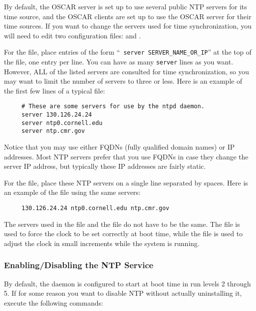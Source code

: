 By default, the OSCAR server is set up to use several public NTP
servers for its time source, and the OSCAR clients are set up to use
the OSCAR server for their time sources.  If you want to change the
servers used for time synchronization, you will need to edit two
configuration files:  and
.

For the  file, place entries of the form ``{\tt
  server SERVER\_NAME\_OR\_IP}'' at the top of the file, one entry per
line.  You can have as many {\tt server} lines as you want.  However,
ALL of the listed servers are consulted for time synchronization, so
you may want to limit the number of servers to three or less.  Here is
an example of the first few lines of a typical 
file:

\begin{verbatim}
     # These are some servers for use by the ntpd daemon.
     server 130.126.24.24
     server ntp0.cornell.edu
     server ntp.cmr.gov
\end{verbatim}

Notice that you may use either FQDNs (fully qualified domain names) or
IP addresses.  Most NTP servers prefer that you use FQDNs in case they
change the server IP address, but typically these IP addresses are
fairly static.

For the  file, place these NTP servers on
a single line separated by spaces.  Here is an example of the
 file using the same servers:

\begin{verbatim}
     130.126.24.24 ntp0.cornell.edu ntp.cmr.gov
\end{verbatim}

The servers used in the  file and the
 file do not have to be the same.  The
 file is used to force the clock to be set
correctly at boot time, while the  file is used to
adjust the clock in small increments while the system is running.

\subsubsection{Enabling/Disabling the NTP Service}

By default, the  daemon is configured to start at boot time
in run levels 2 through 5.  If for some reason you want to disable NTP
without actually uninstalling it, execute the following commands:

